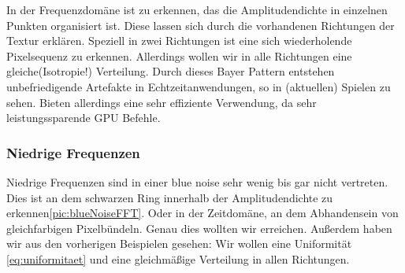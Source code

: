 In der Frequenzdomäne ist zu erkennen, das die Amplitudendichte in einzelnen
Punkten organisiert ist. Diese lassen sich durch die vorhandenen
Richtungen der Textur erklären. Speziell in zwei Richtungen ist eine sich
wiederholende Pixelsequenz zu erkennen.
Allerdings wollen wir in alle Richtungen eine gleiche(Isotropie!) 
Verteilung. Durch dieses Bayer Pattern entstehen unbefriedigende 
Artefakte in Echtzeitanwendungen, so in (aktuellen) Spielen 
\cite{bluenoisewronski} zu sehen. Bieten allerdings eine sehr effiziente
Verwendung, da sehr leistungssparende GPU Befehle.

\subsubsection{Niedrige Frequenzen}

Niedrige Frequenzen sind in einer blue noise sehr wenig bis gar nicht 
vertreten. Dies ist an dem schwarzen Ring innerhalb der Amplitudendichte
zu erkennen\ref{pic:blueNoiseFFT}. Oder in der Zeitdomäne, an dem 
Abhandensein von gleichfarbigen Pixelbündeln. Genau dies wollten wir 
erreichen.
Außerdem haben wir aus den vorherigen Beispielen gesehen: Wir wollen 
eine Uniformität \ref{eq:uniformitaet} und eine gleichmäßige Verteilung
in allen Richtungen.

